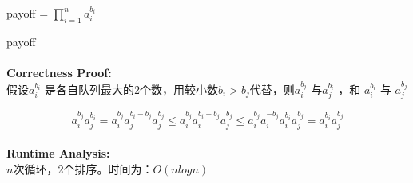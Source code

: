 \documentclass[11pt]{article}
\begin{document}
\begin{CJK*}{GBK}{song}
\begin{algorithm}
\begin{algorithmic}[1]
                        \State payoff = $\prod^{n}_{i=1} a^{b_i}_{i}$

                \EndFor
                \State \Return payoff
            \EndFunction
        \end{algorithmic}
    \end{algorithm}


\paragraph{}\textbf{Correctness Proof:}\\
假设$a^{b_i}_{i}$ 是各自队列最大的2个数，用较小数$b_i > b_j $代替，则$a^{b_j}_{i}$ 与$a^{b_i}_{j}$ ，和 $a^{b_i}_{i}$ 与 $a^{b_j}_{j}$

\begin{equation*}
a^{b_j}_{i} a^{b_i}_{j} = a^{b_j}_{i} a^{b_i - b_j}_{j} a^{b_j}_{j}
                        \leq a^{b_j}_{i} a^{b_i - b_j}_{i} a^{b_j}_{j}
                        \leq a^{b_j}_{i} a^{-b_j}_{i} a^{b_i}_{i} a^{b_j}_{j}
                        = a^{b_i}_{i} a^{b_j}_{j}
\end{equation*}


\paragraph{}\textbf{Runtime Analysis:} \\
$n$次循环，2个排序。时间为：$O(n log n)$

\end{CJK*}
\end{document}
